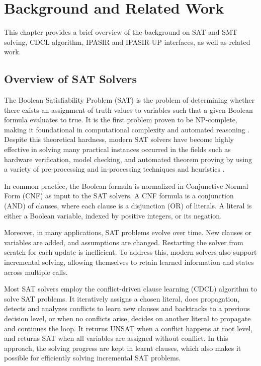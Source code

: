 \chapter{Background and Related Work}

This chapter provides a brief overview of the background on SAT and SMT solving, CDCL algorithm, IPASIR and IPASIR-UP interfaces, as well as related work.

\section{Overview of SAT Solvers}

The Boolean Satisfiability Problem (SAT) is the problem of determining whether there exists an assignment of truth values to variables such that a given Boolean formula evaluates to true. It is the first problem proven to be NP-complete, making it foundational in computational complexity and automated reasoning \cite{10.1145/800157.805047}\cite{Lev73}. Despite this theoretical hardness, modern SAT solvers have become highly effective in solving many practical instances occurred in the fields such as hardware verification, model checking, and automated theorem proving by using a variety of pre-processing and in-processing techniques and heuristics \cite{10.1145/368273.368557}\cite{MINGTE1990289}\cite{267789}.

In common practice, the Boolean formula is normalized in Conjunctive Normal Form (CNF) as input to the SAT solvers. A CNF formula is a conjunction (AND) of clauses, where each clause is a disjunction (OR) of literals. A literal is either a Boolean variable, indexed by positive integers, or its negation.

Moreover, in many applications, SAT problems evolve over time. New clauses or variables are added, and assumptions are changed. Restarting the solver from scratch for each update is inefficient. To address this, modern solvers also support incremental solving, allowing themselves to retain learned information and states across multiple calls.

Most SAT solvers employ the conflict-driven clause learning (CDCL) algorithm to solve SAT problems. It iteratively assigns a chosen literal, does propagation, detects and analyzes conflicts to learn new clauses and backtracks to a previous decision level, or when no conflicts arise, decides on another literal to propagate and continues the loop. It returns UNSAT when a conflict happens at root level, and returns SAT when all variables are assigned without conflict. In this approach, the solving progress are kept in learnt clauses, which also makes it possible for efficiently solving incremental SAT problems.

